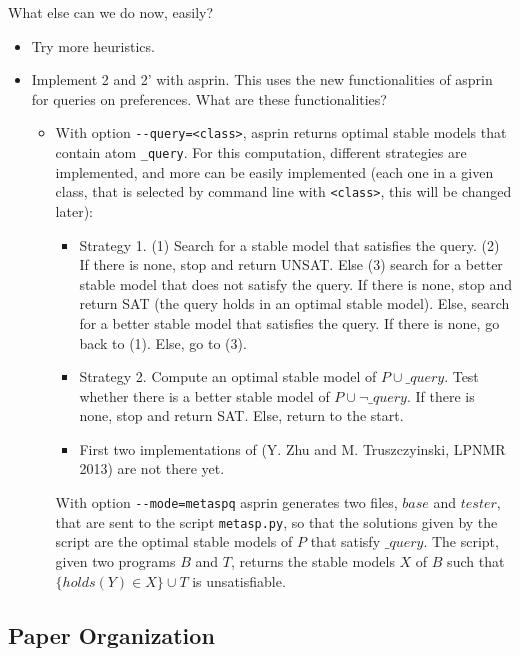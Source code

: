 \documentclass[a4paper,10pt]{article}
\begin{document}
What else can we do now, easily?
\begin{itemize}
\item
Try more heuristics.
\item
Implement 2 and 2' with asprin. 
This uses the new functionalities of asprin for queries on preferences.
What are these functionalities?
\begin{itemize}
    \item
    With option \verb|--query=<class>|, asprin returns optimal stable models that contain atom \verb|_query|.
    For this computation, different strategies are implemented, and more can be easily implemented 
    (each one in a given class, that is selected by command line with \verb|<class>|, this will be changed later):
    \begin{itemize}
    \item
    Strategy 1. (1) Search for a stable model that satisfies the query. 
    (2) If there is none, stop and return UNSAT.
    Else (3) search for a better stable model that does not satisfy the query. 
    If there is none, stop and return SAT (the query holds in an optimal stable model).
    Else, search for a better stable model that satisfies the query.
    If there is none, go back to (1).
    Else, go to (3).
    \item
    Strategy 2. Compute an optimal stable model of $P \cup \_query$.
    Test whether there is a better stable model of $P \cup \neg \_query$.
    If there is none, stop and return SAT. 
    Else, return to the start.
    \item
    First two implementations of (Y. Zhu and M. Truszczyinski, LPNMR 2013) are not there yet.
    \end{itemize}
    With option \verb|--mode=metaspq| asprin generates two files, $base$ and $tester$, 
    that are sent to the script \verb|metasp.py|, 
    so that the solutions given by the script are the optimal stable models of $P$ that satisfy $\_query$.
    The script, given two programs $B$ and $T$, returns the stable models $X$ of $B$ such that 
    $\{ holds(Y) \in X\} \cup T$ is unsatisfiable.
\end{itemize}
\end{itemize}

\subsection{Paper Organization} 
\end{document}
